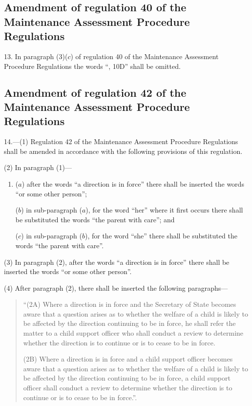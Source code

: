 \documentclass[a4paper]{article}
\begin{document}
\subsection[13. Amendment of regulation 40 of the Maintenance Assessment Procedure Regulations]{Amendment of regulation 40 of the Maintenance Assessment Procedure Regulations}

13.  In paragraph (3)($c$) of regulation 40 of the Maintenance Assessment Procedure Regulations the words “, 10D” shall be omitted.

\subsection[14. Amendment of regulation 42 of the Maintenance Assessment Procedure Regulations]{Amendment of regulation 42 of the Maintenance Assessment Procedure Regulations}

14.—(1) Regulation 42 of the Maintenance Assessment Procedure Regulations shall be amended in accordance with the following provisions of this regulation.

(2) In paragraph (1)---
\begin{enumerate}\item[]
($a$) after the words “a direction is in force” there shall be inserted the words “or some other person”;

($b$) in sub-paragraph ($a$), for the word “her” where it first occurs there shall be substituted the words “the parent with care”; and

($c$) in sub-paragraph ($b$), for the word “she” there shall be substituted the words “the parent with care”.
\end{enumerate}

(3) In paragraph (2), after the words “a direction is in force” there shall be inserted the words “or some other person”.

(4) After paragraph (2), there shall be inserted the following paragraphs---
\begin{quotation}
“(2A) Where a direction is in force and the Secretary of State becomes aware that a question arises as to whether the welfare of a child is likely to be affected by the direction continuing to be in force, he shall refer the matter to a child support officer who shall conduct a review to determine whether the direction is to continue or is to cease to be in force.

(2B) Where a direction is in force and a child support officer becomes aware that a question arises as to whether the welfare of a child is likely to be affected by the direction continuing to be in force, a child support officer shall conduct a review to determine whether the direction is to continue or is to cease to be in force.”.
\end{quotation}
\end{document}
